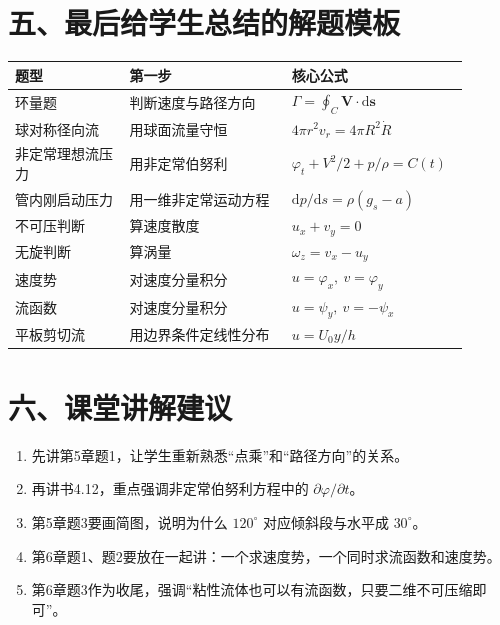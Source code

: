 \documentclass[12pt,a4paper]{ctexart}
\newcommand{\dd}{\mathrm d}
\begin{document}
\section*{五、最后给学生总结的解题模板}

\begin{center}
\begin{tabular}{p{0.24\linewidth}p{0.34\linewidth}p{0.32\linewidth}}
\toprule
题型 & 第一步 & 核心公式 \\
\midrule
环量题 & 判断速度与路径方向 & $\Gamma=\oint_C\bm V\cdot\dd\bm s$ \\
球对称径向流 & 用球面流量守恒 & $4\pi r^2v_r=4\pi R^2\dot R$ \\
非定常理想流压力 & 用非定常伯努利 & $\varphi_t+V^2/2+p/\rho=C(t)$ \\
管内刚启动压力 & 用一维非定常运动方程 & $\dd p/\dd s=\rho(g_s-a)$ \\
不可压判断 & 算速度散度 & $u_x+v_y=0$ \\
无旋判断 & 算涡量 & $\omega_z=v_x-u_y$ \\
速度势 & 对速度分量积分 & $u=\varphi_x,\ v=\varphi_y$ \\
流函数 & 对速度分量积分 & $u=\psi_y,\ v=-\psi_x$ \\
平板剪切流 & 用边界条件定线性分布 & $u=U_0y/h$ \\
\bottomrule
\end{tabular}
\end{center}

\section*{六、课堂讲解建议}

\begin{enumerate}
  \item 先讲第5章题1，让学生重新熟悉“点乘”和“路径方向”的关系。
  \item 再讲书4.12，重点强调非定常伯努利方程中的 $\partial\varphi/\partial t$。
  \item 第5章题3要画简图，说明为什么 $120^\circ$ 对应倾斜段与水平成 $30^\circ$。
  \item 第6章题1、题2要放在一起讲：一个求速度势，一个同时求流函数和速度势。
  \item 第6章题3作为收尾，强调“粘性流体也可以有流函数，只要二维不可压缩即可”。
\end{enumerate}
\end{document}
